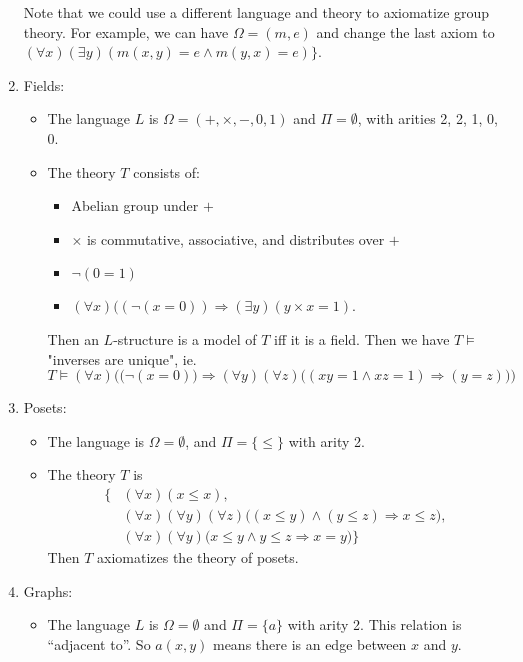 \documentclass[a4paper]{article}
\begin{document}
\begin{eg}
\begin{enumerate}
     Note that we could use a different language and theory to axiomatize group theory. For example, we can have $\Omega = (m, e)$ and change the last axiom to $(\forall x)(\exists y)(m(x, y) = e\wedge m(y, x) = e)\}$.
  \item Fields:
    \begin{itemize}
      \item The language $L$ is $\Omega = (+, \times, -, 0, 1)$ and $\Pi = \emptyset$, with arities 2, 2, 1, 0, 0.
      \item The theory $T$ consists of:
        \begin{itemize}
          \item Abelian group under $+$
          \item $\times$ is commutative, associative, and distributes over $+$
          \item $\neg (0 = 1)$
          \item $(\forall x)((\neg(x = 0)) \Rightarrow (\exists y)(y\times x = 1)$.
        \end{itemize}
        Then an $L$-structure is a model of $T$ iff it is a field. Then we have $T\models$ "inverses are unique", ie.
        \[
          T\models (\forall x)\Big(\big(\neg(x = 0)\big) \Rightarrow (\forall y)(\forall z)\big((xy = 1 \wedge xz = 1)\Rightarrow (y = z)\big)\Big)
        \]
    \end{itemize}
  \item Posets:
    \begin{itemize}
      \item The language is $\Omega = \emptyset$, and $\Pi=\{\leq\}$ with arity 2.
      \item The theory $T$ is
        \begin{align*}
          \{& (\forall x)(x \leq x),\\
            & (\forall x)(\forall y)(\forall z)\big((x \leq y)\wedge(y \leq z) \Rightarrow x \leq z\big),\\
          & (\forall x)(\forall y)\big(x \leq y \wedge y \leq z \Rightarrow x = y\big)\}
        \end{align*}
        Then $T$ axiomatizes the theory of posets.
    \end{itemize}
  \item Graphs:
    \begin{itemize}
      \item The language $L$ is $\Omega = \emptyset$ and $\Pi = \{a\}$ with arity 2. This relation is ``adjacent to''. So $a(x, y)$ means there is an edge between $x$ and $y$.

\end{itemize}
\end{enumerate}
\end{eg}
\end{document}
